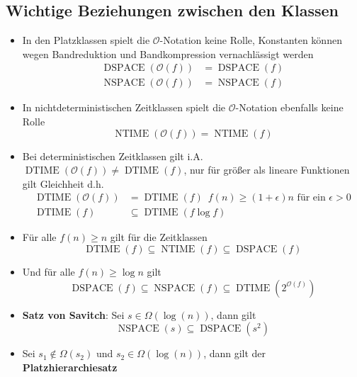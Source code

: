 \subsection{Wichtige Beziehungen zwischen den Klassen}
\begin{itemize}
	\item In den Platzklassen spielt die $\mathcal O$-Notation keine Rolle, Konstanten können wegen Bandreduktion und Bandkompression vernachlässigt werden
	\begin{align*}
		\operatorname{DSPACE}(\mathcal O(f))&=\operatorname{DSPACE}(f)\\
		\operatorname{NSPACE}(\mathcal O(f))&=\operatorname{NSPACE}(f)
	\end{align*}
	\item In nichtdeterministischen Zeitklassen spielt die $\mathcal O$-Notation ebenfalls keine Rolle
	\begin{equation*}
		\operatorname{NTIME}(\mathcal O(f))=\operatorname{NTIME}(f)
	\end{equation*}
	\item Bei deterministischen Zeitklassen gilt i.A. $\operatorname{DTIME}(\mathcal O(f))\not=\operatorname{DTIME}(f)$, nur für größer als lineare Funktionen gilt Gleichheit d.h.
	\begin{align*}
		\operatorname{DTIME}(\mathcal O(f))&=\operatorname{DTIME}(f) \enspace f(n)\geq (1+\epsilon)n\text{ für ein }\epsilon>0\\
		\operatorname{DTIME}(f)&\subseteq \operatorname{DTIME}(f\log f)
	\end{align*}
	\item Für alle $f(n)\geq n$ gilt für die Zeitklassen
	\begin{equation*}
		\operatorname{DTIME}(f)\subseteq\operatorname{NTIME}(f)\subseteq\operatorname{DSPACE}(f)
	\end{equation*}
	\item Und für alle $f(n)\geq \log n$ gilt
	\begin{equation*}
		\operatorname{DSPACE}(f)\subseteq\operatorname{NSPACE}(f)\subseteq\operatorname{DTIME}(2^{\mathcal O(f)})
	\end{equation*}
	\item \textbf{Satz von Savitch}: Sei $s\in\Omega(\log(n))$, dann gilt
	\begin{equation*}
		\operatorname{NSPACE}(s)\subseteq\operatorname{DSPACE}(s^2)
	\end{equation*}
	\item Sei $s_1\not\in\Omega(s_2)$ und $s_2\in\Omega(\log(n))$, dann gilt der \textbf{Platzhierarchiesatz}

\end{itemize}
